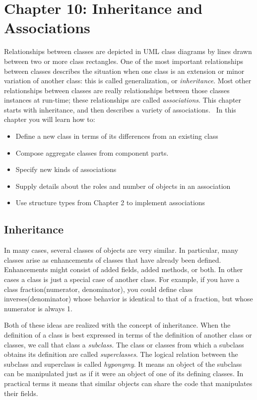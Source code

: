 \clearpage\section{Chapter 10: Inheritance and Associations}

Relationships between classes are depicted in UML class diagrams by
lines drawn between two or more class rectangles. One of the most
important relationships between classes describes the situation when
one class is an extension or minor variation of another class: this is
called generalization, or \textit{inheritance}. Most other
relationships between classes are really relationships between those
classes{\textquotesingle} instances at run-time; these
relationships are called \textit{associations}. This chapter starts
with inheritance, and then describes a variety of associations. \ In
this chapter you will learn how to:

\begin{itemize}
\item Define a new class in terms of its differences from an existing
class
\item Compose aggregate classes from component parts.
\item Specify new kinds of associations
\item Supply details about the roles and number of objects in an
association
\item Use structure types from Chapter 2 to implement associations
\end{itemize}

\subsection{Inheritance}

In many cases, several classes of objects are very similar. In
particular, many classes arise as enhancements of classes that have
already been defined. Enhancements might consist of added fields, added
methods, or both. In other cases a class is just a special case of
another class. For example, if you have a class
\textsf{fraction(numerator, denominator)}, you could define class
\textsf{inverses(denominator)} whose behavior is identical to that of a
fraction, but whose numerator is always 1. 

Both of these ideas are realized with the concept of
inheritance. When the definition of a class is best
expressed in terms of the definition of another class or classes, we
call that class a \textit{subclass.} The class or
classes from which a subclass obtains its definition are called
\textit{superclass}\textit{es}. The logical relation
between the subclass and superclass is called \textit{hyponymy}. It
means an object of the subclass can be manipulated just as if it were
an object of one of its defining classes. In practical terms it means
that similar objects can share the code that manipulates their fields.

